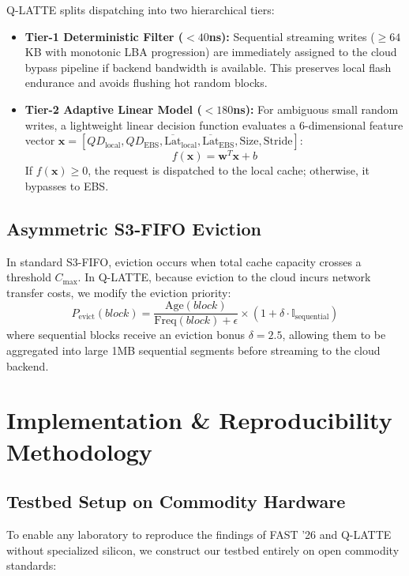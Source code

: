 \documentclass[10pt,twocolumn]{article}
\begin{document}
Q-LATTE splits dispatching into two hierarchical tiers:
\begin{itemize}
    \item \textbf{Tier-1 Deterministic Filter ($<40$ns):} Sequential streaming writes ($\ge 64$KB with monotonic LBA progression) are immediately assigned to the cloud bypass pipeline if backend bandwidth is available. This preserves local flash endurance and avoids flushing hot random blocks.
    \item \textbf{Tier-2 Adaptive Linear Model ($<180$ns):} For ambiguous small random writes, a lightweight linear decision function evaluates a 6-dimensional feature vector $\mathbf{x} = [QD_{\text{local}}, QD_{\text{EBS}}, \overline{\text{Lat}}_{\text{local}}, \overline{\text{Lat}}_{\text{EBS}}, \text{Size}, \text{Stride}]$:
    \begin{equation}
        f(\mathbf{x}) = \mathbf{w}^T \mathbf{x} + b
    \end{equation}
    If $f(\mathbf{x}) \ge 0$, the request is dispatched to the local cache; otherwise, it bypasses to EBS.
\end{itemize}

\subsection{Asymmetric S3-FIFO Eviction}
In standard S3-FIFO, eviction occurs when total cache capacity crosses a threshold $C_{\max}$. In Q-LATTE, because eviction to the cloud incurs network transfer costs, we modify the eviction priority:
\begin{equation}
    P_{\text{evict}}(block) = \frac{\text{Age}(block)}{\text{Freq}(block) + \epsilon} \times \left(1 + \delta \cdot \mathbb{I}_{\text{sequential}}\right)
\end{equation}
where sequential blocks receive an eviction bonus $\delta = 2.5$, allowing them to be aggregated into large 1MB sequential segments before streaming to the cloud backend.

\section{Implementation \& Reproducibility Methodology}

\subsection{Testbed Setup on Commodity Hardware}
To enable any laboratory to reproduce the findings of FAST '26 and Q-LATTE without specialized silicon, we construct our testbed entirely on open commodity standards:
\end{document}
